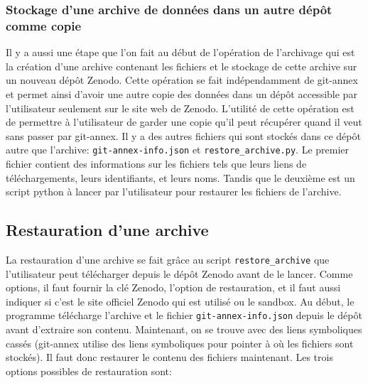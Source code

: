 \documentclass[11pt]{article}
\begin{document}
\subsubsection{Stockage d'une archive de données dans un autre dépôt comme copie}
\label{sec:orge998835}
Il y a aussi une étape que l'on fait au début de l'opération de
l'archivage qui est la création d'une archive contenant les fichiers
et le stockage de cette archive sur un nouveau dépôt Zenodo. 
Cette opération se fait indépendamment de git-annex et permet ainsi
d'avoir une autre copie des données dans un dépôt accessible par
l'utilisateur seulement sur le site web de Zenodo.
L'utilité de cette opération est de permettre à l'utilisateur de
garder une copie qu'il peut récupérer quand il veut sans passer par
git-annex. Il y a des autres fichiers qui sont stockés dans ce dépôt
autre que l'archive: \texttt{git-annex-info.json} et \texttt{restore\_archive.py}. Le
premier fichier contient des informations sur les fichiers tels que
leurs liens de téléchargements, leurs identifiants, et leurs
noms. Tandis que le deuxième est un script python à lancer par
l'utilisateur pour restaurer les fichiers de l'archive. 

\subsection{Restauration d'une archive}
\label{sec:orgcc12d0d}
La restauration d'une archive se fait grâce au script \texttt{restore\_archive}
que l'utilisateur peut télécharger depuis le dépôt Zenodo avant de le
lancer. Comme options, il faut fournir la clé Zenodo, l'option de
restauration, et il faut aussi indiquer si c'est le site officiel
Zenodo qui est utilisé ou le sandbox.
Au début, le programme télécharge l'archive et le fichier
\texttt{git-annex-info.json} depuis le dépôt avant d'extraire son
contenu. Maintenant, on se trouve avec des liens symboliques cassés
(git-annex utilise des liens symboliques pour pointer à où les
fichiers sont stockés). Il faut donc restaurer le contenu des fichiers
maintenant. Les trois options possibles de restauration sont:
\end{document}

